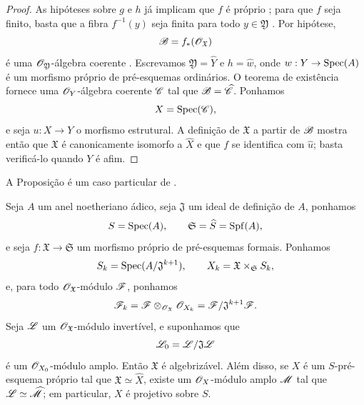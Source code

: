 \begin{proof}
As hipóteses sobre $g$ e $h$ já implicam que $f$ é próprio
; para que $f$ seja finito, basta que a fibra
$f^{-1}(y)$ seja finita para todo $y\in\mathfrak{Y}$
. Por hipótese,
\[
  \mathscr{B}=f_*(\mathscr{O}_{\mathfrak{X}})
\]
é uma $\mathscr{O}_{\mathfrak{Y}}$-álgebra coerente
. Escrevamos
$\mathfrak{Y}=\widehat{Y}$ e $h=\widehat{w}$, onde
$w:Y\to\Spec(A)$ é um morfismo próprio de pré-esquemas ordinários. O
teorema de existência fornece uma $\mathscr{O}_Y$-álgebra coerente $\mathscr{C}$
tal que $\mathscr{B}=\widehat{\mathscr{C}}$. Ponhamos
\[
  X=\operatorname{Spec}(\mathscr{C}),
\]
e seja $u:X\to Y$ o morfismo estrutural. A definição de
$\mathfrak{X}$ a partir de $\mathscr{B}$  mostra então que
$\mathfrak{X}$ é canonicamente isomorfo a $\widehat{X}$ e
que $f$ se identifica com $\widehat{u}$; basta verificá-lo
quando $Y$ é afim.
\end{proof}

A Proposição  é um caso particular de
.

\begin{theorem}[5.4.5]
\label{III.5.4.5}
Seja $A$ um anel noetheriano ádico, seja $\mathfrak{J}$ um ideal
de definição de $A$, ponhamos
\[
  S=\operatorname{Spec}(A),\qquad
  \mathfrak{S}=\widehat{S}=\operatorname{Spf}(A),
\]
e seja $f:\mathfrak{X}\to\mathfrak{S}$ um morfismo próprio de
pré-esquemas formais. Ponhamos
\[
  S_k=\operatorname{Spec}(A/\mathfrak{J}^{k+1}),\qquad
  X_k=\mathfrak{X}\times_{\mathfrak{S}}S_k,
\]
e, para todo $\mathscr{O}_{\mathfrak{X}}$-módulo $\mathscr{F}$, ponhamos
\[
  \mathscr{F}_k
  =\mathscr{F}\otimes_{\mathscr{O}_{\mathfrak{X}}}\mathscr{O}_{X_k}
  =\mathscr{F}/\mathfrak{J}^{k+1}\mathscr{F}.
\]
Seja $\mathscr{L}$ um
$\mathscr{O}_{\mathfrak{X}}$-módulo invertível, e suponhamos que
\[
  \mathscr{L}_0=\mathscr{L}/\mathfrak{J}\mathscr{L}
\]
é um $\mathscr{O}_{X_0}$-módulo amplo. Então $\mathfrak{X}$ é
algebrizável. Além disso, se $X$ é um $S$-pré-esquema próprio tal
que $\mathfrak{X}\simeq\widehat{X}$, existe um
$\mathscr{O}_X$-módulo amplo $\mathscr{M}$ tal que
$\mathscr{L}\simeq\widehat{\mathscr{M}}$; em particular, $X$ é projetivo
sobre $S$.
\end{theorem}

